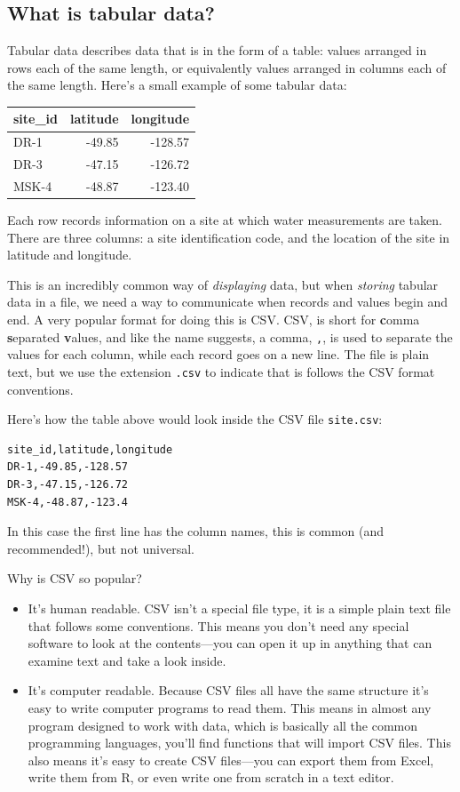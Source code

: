 \documentclass[]{Nemilov}
\providecommand{\tightlist}{%
  \setlength{\itemsep}{0pt}\setlength{\parskip}{0pt}}
\begin{document}
\hypertarget{what-is-tabular-data}{%
\subsection{What is tabular data?}\label{what-is-tabular-data}}

Tabular data describes data that is in the form of a table: values arranged in rows each of the same length, or equivalently values arranged in columns each of the same length. Here's a small example of some tabular data:

\begin{tabular}{l|r|r}
\hline
site\_id & latitude & longitude\\
\hline
DR-1 & -49.85 & -128.57\\
\hline
DR-3 & -47.15 & -126.72\\
\hline
MSK-4 & -48.87 & -123.40\\
\hline
\end{tabular}

Each row records information on a site at which water measurements are taken. There are three columns: a site identification code, and the location of the site in latitude and longitude.

This is an incredibly common way of \emph{displaying} data, but when \emph{storing} tabular data in a file, we need a way to communicate when records and values begin and end. A very popular format for doing this is CSV. CSV, is short for \textbf{c}omma \textbf{s}eparated \textbf{v}alues, and like the name suggests, a comma, \texttt{,}, is used to separate the values for each column, while each record goes on a new line. The file is plain text, but we use the extension \texttt{.csv} to indicate that is follows the CSV format conventions.

Here's how the table above would look inside the CSV file \texttt{site.csv}:

\begin{verbatim}
site_id,latitude,longitude
DR-1,-49.85,-128.57
DR-3,-47.15,-126.72
MSK-4,-48.87,-123.4
\end{verbatim}

In this case the first line has the column names, this is common (and recommended!), but not universal.

Why is CSV so popular?

\begin{itemize}
\tightlist
\item
  It's human readable. CSV isn't a special file type, it is a simple plain text file that follows some conventions. This means you don't need any special software to look at the contents---you can open it up in anything that can examine text and take a look inside.
\item
  It's computer readable. Because CSV files all have the same structure it's easy to write computer programs to read them. This means in almost any program designed to work with data, which is basically all the common programming languages, you'll find functions that will import CSV files. This also means it's easy to create CSV files---you can export them from Excel, write them from R, or even write one from scratch in a text editor.
\end{itemize}
\end{document}

